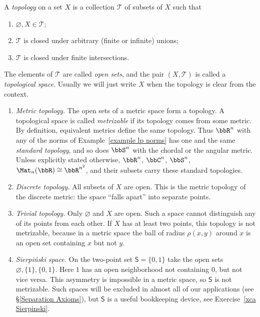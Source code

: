 \begin{defn}[Topology]
    A \emph{topology} on a set $X$ is a collection $\mathcal{T}$ of subsets of $X$ such that
    \begin{enumerate}
        \item $\varnothing, X\in\mathcal{T}$;
        \item $\mathcal{T}$ is closed under arbitrary (finite or infinite) unions;
        \item $\mathcal{T}$ is closed under finite intersections.
    \end{enumerate}
    The elements of $\mathcal{T}$ are called \emph{open sets}, and the pair $(X,\mathcal{T})$ is called a \emph{topological space}. Usually we will just write $X$ when the topology is clear from the context.
\end{defn}

\begin{example}\label{example topologies}
    \begin{enumerate}
        \item \emph{Metric topology.} The open sets of a metric space form a topology. A topological space is called \emph{metrizable} if its topology comes from some metric. By definition, equivalent metrics define the same topology. Thus $\bbR^n$ with any of the norms of Example~\ref{example lp norms} has one and the same \emph{standard topology}, and so does $\bbS^n$ with the chordal or the angular metric. Unless explicitly stated otherwise, $\bbR^n$, $\bbC^n$, $\bbS^n$, $\Mat_n(\bbR)\cong\bbR^{n^2}$, and their subsets carry these standard topologies.
        \item \emph{Discrete topology.} All subsets of $X$ are open. This is the metric topology of the discrete metric: the space ``falls apart'' into separate points.
        \item \emph{Trivial topology.} Only $\varnothing$ and $X$ are open. Such a space cannot distinguish any of its points from each other. If $X$ has at least two points, this topology is not metrizable, because in a metric space the ball of radius $\rho(x,y)$ around $x$ is an open set containing $x$ but not $y$.
        \item \emph{Sierpi\'nski space.} On the two-point set $\mathsf{S}=\{0,1\}$ take the open sets $\varnothing,\{1\},\{0,1\}$. Here $1$ has an open neighborhood not containing $0$, but not vice versa. This asymmetry is impossible in a metric space, so $\mathsf{S}$ is not metrizable. Such spaces will be excluded in almost all of our applications (see \S\ref{Separation Axioms}), but $\mathsf{S}$ is a useful bookkeeping device, see Exercise~\ref{xca Sierpinski}.
    \end{enumerate}
\end{example}

